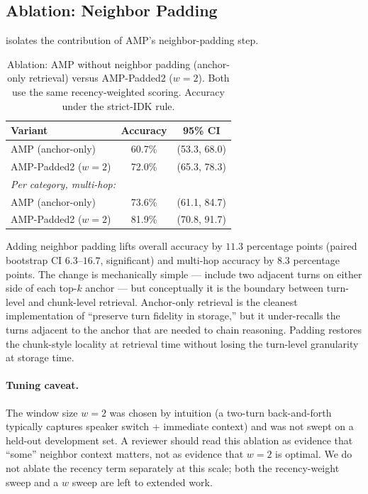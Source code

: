 \subsection{Ablation: Neighbor Padding}
\label{sec:exp-ablation}

 isolates the contribution of AMP's neighbor-padding step.

\begin{table}[t]
\centering
\caption{Ablation: AMP without neighbor padding (anchor-only retrieval) versus AMP-Padded2 ($w = 2$). Both use the same recency-weighted scoring. Accuracy under the strict-IDK rule.}
\label{tab:ablation}
\begin{tabular}{lcc}
\toprule
Variant & Accuracy & 95\% CI \\
\midrule
AMP (anchor-only) & 60.7\% & (53.3, 68.0) \\
AMP-Padded2 ($w=2$) & 72.0\% & (65.3, 78.3) \\
\midrule
\multicolumn{3}{l}{\textit{Per category, multi-hop:}} \\
AMP (anchor-only) & 73.6\% & (61.1, 84.7) \\
AMP-Padded2 ($w=2$) & 81.9\% & (70.8, 91.7) \\
\bottomrule
\end{tabular}
\end{table}

Adding neighbor padding lifts overall accuracy by $11.3$ percentage points (paired bootstrap CI $6.3$--$16.7$, significant) and multi-hop accuracy by $8.3$ percentage points. The change is mechanically simple --- include two adjacent turns on either side of each top-$k$ anchor --- but conceptually it is the boundary between turn-level and chunk-level retrieval. Anchor-only retrieval is the cleanest implementation of ``preserve turn fidelity in storage,'' but it under-recalls the turns adjacent to the anchor that are needed to chain reasoning. Padding restores the chunk-style locality at retrieval time without losing the turn-level granularity at storage time.

\paragraph{Tuning caveat.} The window size $w = 2$ was chosen by intuition (a two-turn back-and-forth typically captures speaker switch + immediate context) and was not swept on a held-out development set. A reviewer should read this ablation as evidence that ``some'' neighbor context matters, not as evidence that $w = 2$ is optimal. We do not ablate the recency term separately at this scale; both the recency-weight sweep and a $w$ sweep are left to extended work.

